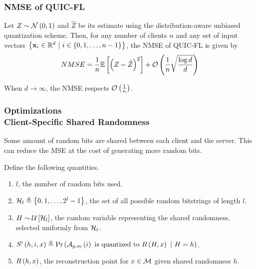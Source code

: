 \documentclass{beamer}
\begin{document}
    \begin{frame}
        \frametitle{NMSE of QUIC-FL}    
        \begin{theorem}
            Let \(Z\sim\mathcal N\left(0,1\right)\) and \(\hat{Z}\) be its estimate using the
            distribution-aware unbiased quantization scheme. Then, for any
            number of clients \(n\) and any set of input vectors
            \(\left\{\boldsymbol{\mathbf{x}}_i \in\mathbb R^d\ |\ i\in\left\{0,1,\ldots,n-1\right\}\right\}\), the
            NMSE of QUIC-FL is given by
            \begin{equation}
                NMSE = \frac{1}{n}\mathbb{E}\left[ \left(Z-\hat{Z}\right)^2 \right] + \mathcal O\left(\frac{1}{n}\sqrt{\frac{\log d}{d}}\right)
                \label{eq:quic-fl-nmse}
            \end{equation}
        \end{theorem}

        When \(d\to\infty\), the NMSE respects \(\mathcal O\left(\frac{1}{n}\right)\).
    \end{frame}

    \begin{frame}
        \frametitle{Optimizations\\\small Client-Specific Shared Randomness}
        Some amount of random bits are shared between each client and the
        server. This can reduce the MSE at the cost of generating more random
        bits.

        Define the following quantities.

        \begin{enumerate}
            \item \(l\), the number of random bits used.
            \item \(\mathcal H_l \triangleq \left\{0,1,\ldots,2^l-1\right\}\), the set of all
            possible random bitstrings of length \(l\).
            \item \(H \sim \mathcal U{}\left[\mathcal H_l\right]\), the random variable representing
            the shared randomness, selected uniformly from \(\mathcal H_l\).
            \item \(S^\prime\left(h,i,x\right) \triangleq \Pr\left(\mathcal A_{p,m}\left(i\right) \text{
            is quantized to } R\left(H, x\right)\ |\ H = h\right)\).
            \item \(R\left(h,x\right)\), the reconstruction point for \(x\in\mathcal M\)
            given shared randomness \(h\).
        \end{enumerate}
    \end{frame}
\end{document}
